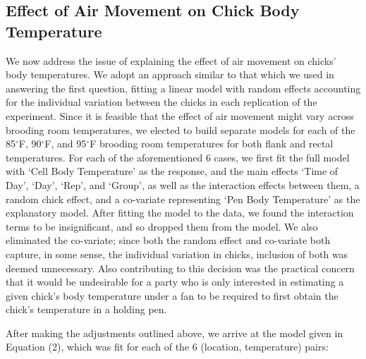 \documentclass[a4paper, 10pt, titlepage]{article}
\begin{document}
\subsection{Effect of Air Movement on Chick Body Temperature}
We now address the issue of explaining the effect of air movement on chicks’ body temperatures. We adopt an approach similar to that which we used in answering the first question, fitting a linear model with random effects accounting for the individual variation between the chicks in each replication of the experiment. Since it is feasible that the effect of air movement might vary across brooding room temperatures, we elected to build separate models for each of the 85$^{\circ}$F, 90$^{\circ}$F, and 95$^{\circ}$F brooding room temperatures for both flank and rectal temperatures. For each of the aforementioned 6 cases, we first fit the full model with `Cell Body Temperature' as the response, and the main effects `Time of Day', `Day', `Rep', and `Group', as well as the interaction effects between them, a random chick effect, and a co-variate representing `Pen Body Temperature' as the explanatory model. After fitting the model to the data, we found the interaction terms to be insignificant, and so dropped them from the model. We also eliminated the co-variate; since both the random effect and co-variate both capture, in some sense, the individual variation in chicks, inclusion of both was deemed unnecessary. Also contributing to this decision was the practical concern that it would be undesirable for a party who is only interested in estimating a given chick's body temperature under a fan to be required to first obtain the chick's temperature in a holding pen. 

\par 

After making the adjustments outlined above, we arrive at the model given in Equation (2), which was fit for each of the 6 (location, temperature) pairs:
\end{document}
